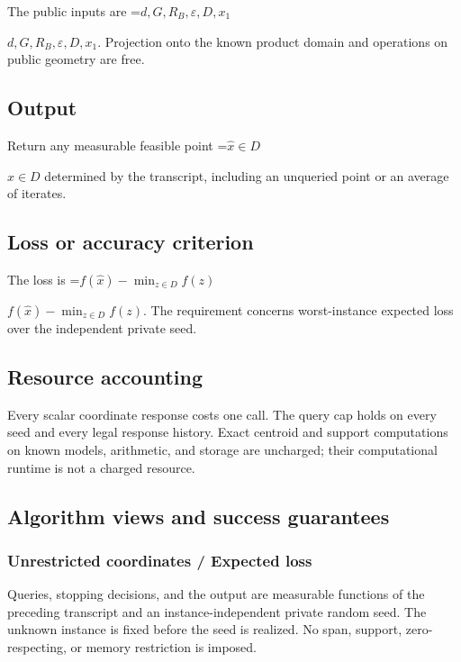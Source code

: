 \documentclass[10pt,a4paper]{article}
\newcommand{\AtlasMath}[1]{\par\begingroup\centering\setbox0=\hbox{$\displaystyle #1$}\ifdim\wd0>1.4\linewidth\typeout{ATLAS WIDE FORMULA: \the\wd0}\fi\ifdim\wd0>\linewidth\resizebox{\linewidth}{!}{\box0}\else\box0\fi\par\endgroup}
\newcommand{\AtlasInlineMath}[1]{\begingroup\setbox0=\hbox{$#1$}\ifdim\wd0>.4\linewidth\endgroup\AtlasMath{#1}\else\endgroup$#1$\fi}
\begin{document}
The public inputs are \AtlasInlineMath{d,G,R_B,\varepsilon,D,x_1}. Projection onto the known product domain and operations on public geometry are free.



\subsection{Output}


Return any measurable feasible point \AtlasInlineMath{\widehat x\in D} determined by the transcript, including an unqueried point or an average of iterates.



\subsection{Loss or accuracy criterion}


The loss is \AtlasInlineMath{f(\widehat x)-\min_{z\in D}f(z)}. The requirement concerns worst-instance expected loss over the independent private seed.



\subsection{Resource accounting}


Every scalar coordinate response costs one call. The query cap holds on every seed and every legal response history. Exact centroid and support computations on known models, arithmetic, and storage are uncharged; their computational runtime is not a charged resource.



\subsection{Algorithm views and success guarantees}


\subsubsection{Unrestricted coordinates / Expected loss}


Queries, stopping decisions, and the output are measurable functions of the preceding transcript and an instance-independent private random seed. The unknown instance is fixed before the seed is realized. No span, support, zero-respecting, or memory restriction is imposed.
\end{document}
